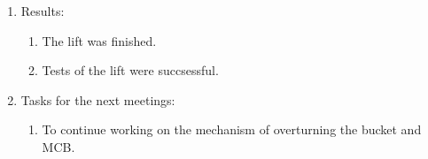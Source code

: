 \begin{enumerate}
\begin{enumerate}
	\end{enumerate}
	
	\item Results:  
	\begin{enumerate}
		\item The lift was finished.
		
		\item Tests of the lift were succsessful.
		
	\end{enumerate}
	
	\item Tasks for the next meetings:
	\begin{enumerate}
		\item To continue working on the mechanism of overturning the bucket and MCB.
		
	\end{enumerate}     
\end{enumerate}
\fillpage
